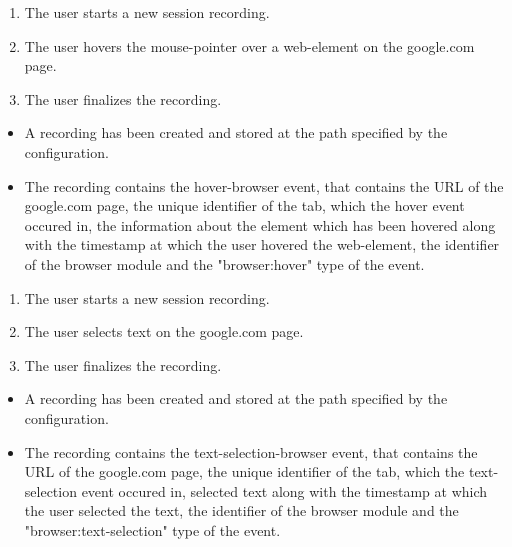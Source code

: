\begin{tests}
	
	{\begin{enumerate}
		\item The \gls{user} starts a new \gls{session} recording.
		\item The \gls{user} hovers the mouse-pointer over a web-element on the google.com page.
		\item The \gls{user} finalizes the recording.
	\end{enumerate}}
	{\begin{itemize}
		\item A recording has been created and stored at the path specified by the configuration.
		\item The recording contains the hover-browser \gls{event},  that contains the URL of the google.com page, the unique identifier of the tab, which the hover \gls{event} occured in, the information about the element which has been hovered along with the timestamp at which the \gls{user} hovered the web-element, the identifier of the \gls{browser} module and the "browser:hover" type of the event.
	\end{itemize}}
	
	
	{\begin{enumerate}
		\item The \gls{user} starts a new \gls{session} recording.
		\item The \gls{user} selects text on the google.com page.
		\item The \gls{user} finalizes the recording.
	\end{enumerate}}
	{\begin{itemize}
		\item A recording has been created and stored at the path specified by the configuration.
		\item The recording contains the text-selection-browser \gls{event},  that contains the URL of the google.com page, the unique identifier of the tab, which the text-selection \gls{event} occured in, selected text along with the timestamp at which the \gls{user} selected the text, the identifier of the \gls{browser} module and the "browser:text-selection" type of the event.
	\end{itemize}}
	

\end{tests}
